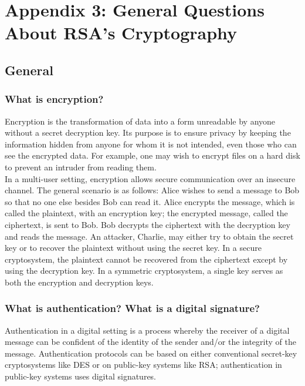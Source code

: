 \chapter{Appendix 3: General Questions About RSA's Cryptography}

\section{General}

\subsection{What is encryption?}

Encryption is the transformation of data into a form unreadable by
anyone without a secret decryption key. Its purpose is to ensure
privacy by keeping the information hidden from anyone for whom it is
not intended, even those who can see the encrypted data. For example,
one may wish to encrypt files on a hard disk to prevent an intruder
from reading them.\\

In a multi-user setting, encryption allows secure communication over an
insecure channel. The general scenario is as follows: Alice wishes to
send a message to Bob so that no one else besides Bob can read it.
Alice encrypts the message, which is called the plaintext, with an
encryption key; the encrypted message, called the ciphertext, is sent
to Bob. Bob decrypts the ciphertext with the decryption key and reads
the message. An attacker, Charlie, may either try to obtain the secret
key or to recover the plaintext without using the secret key. In a
secure cryptosystem, the plaintext cannot be recovered from the
ciphertext except by using the decryption key. In a symmetric
cryptosystem, a single key serves as both the encryption and decryption
keys.

\subsection{What is authentication? What is a digital signature?}

Authentication in a digital setting is a process whereby the receiver
of a digital message can be confident of the identity of the sender
and/or the integrity of the message. Authentication protocols can be
based on either conventional secret-key cryptosystems like DES or on
public-key systems like RSA; authentication in public-key systems uses
digital signatures.\\

